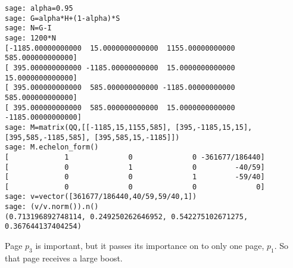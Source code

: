 \begin{exercises}
\begin{answer}
\begin{exparts}
\begin{lstlisting}
sage: alpha=0.95 
sage: G=alpha*H+(1-alpha)*S     
sage: N=G-I
sage: 1200*N         
[-1185.00000000000  15.0000000000000  1155.00000000000  585.000000000000]
[ 395.000000000000 -1185.00000000000  15.0000000000000  15.0000000000000]
[ 395.000000000000  585.000000000000 -1185.00000000000  585.000000000000]
[ 395.000000000000  585.000000000000  15.0000000000000 -1185.00000000000]
sage: M=matrix(QQ,[[-1185,15,1155,585], [395,-1185,15,15], [395,585,-1185,585], [395,585,15,-1185]])
sage: M.echelon_form()        
[             1              0              0 -361677/186440]
[             0              1              0         -40/59]
[             0              0              1         -59/40]
[             0              0              0              0]
sage: v=vector([361677/186440,40/59,59/40,1])
sage: (v/v.norm()).n()
(0.713196892748114, 0.249250262646952, 0.542275102671275, 0.367644137404254)
\end{lstlisting}
       \item Page $p_3$ is important, but it passes its importance on to
         only one page, $p_1$.
         So that page receives a large boost.
      \end{exparts}    
    \end{answer}
\end{exercises}
\endinput



